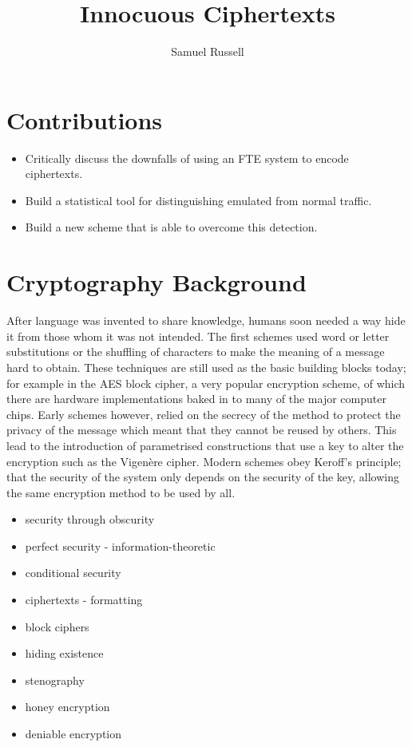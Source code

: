 \documentclass[12pt,a4paper]{article}
\author{Samuel Russell}
\title{Innocuous Ciphertexts}
\begin{document}
\maketitle

\section{Contributions}

\begin{itemize}
\item Critically discuss the downfalls of using an FTE system to encode ciphertexts.
\item Build a statistical tool for distinguishing emulated from normal traffic.
\item Build a new scheme that is able to overcome this detection.
\end{itemize}

\pagebreak
\section{Cryptography Background}
After language was invented to share knowledge, humans soon needed a way hide it from those whom it was not intended. The first schemes used word or letter substitutions or the shuffling of characters to make the meaning of a message hard to obtain. These techniques are still used as the basic building blocks today; for example in the AES block cipher, a very popular encryption scheme, of which there are hardware implementations baked in to many of the major computer chips. Early schemes however, relied on the secrecy of the method to protect the privacy of the message which meant that they cannot be reused by others. This lead to the introduction of parametrised constructions that use a key to alter the encryption such as the Vigen\`ere cipher. Modern schemes obey Keroff's principle; that the security of the system only depends on the security of the key, allowing the same encryption method to be used by all.
\begin{itemize}
 \item security through obscurity
 \item perfect security - information-theoretic
 \item conditional security
 \item ciphertexts - formatting
 \item block ciphers
\end{itemize}

\begin{itemize}
 \item hiding existence
 \item stenography
 \item honey encryption
 \item deniable encryption
\end{itemize}
\end{document}
